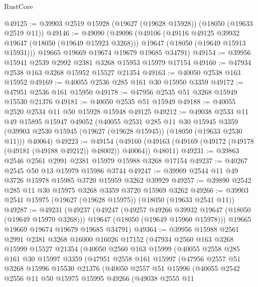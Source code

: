 \begin{lexlean}{RustCore}
\begin{coremodule}
@49125 := @39903 @2519 @15928 (@19627 (@19628 @15928)) (@18050 (@19633 @2519 @11))
@49146 := @49090
    (@49096
      (@49106
        (@49116 @49125 @39932 @19647 (@18050 (@19649 @15923 @3268)))
        @19647
        (@18050 (@19649 @15913 @15931)))
      @19665
      @19669
      @19674
      @19679
      @19685
      @34791)
@49154 := @39956 @15941 @2539 @2992 @2381 @3268 @15953 @15979 @17154
@49160 := @47934 @2538 @163 @3268 @15952 @15527 @21354
@49163 := @40050 @2538 @163 @15952
@49169 := @40055 @2536 @285 @161 @30 @15950 @3359
@49172 := @47951 @2536 @161 @15950
@49178 := @47956 @2535 @51 @3268 @15949 @15530 @21376
@49181 := @40050 @2535 @51 @15949
@49188 := @40055 @2520 @2534 @11 @50 @15928 @15948 @49125
@49212 := @49038
    @2533
    @11
    @49
    @15895
    @15947
    @49052
    (@40055
      @2531
      @285
      @11
      @30
      @15945
      @3359
      (@39903 @2530 @15945 (@19627 (@19628 @15945)) (@18050 (@19633 @2530 @11)))
      @40064)
@49223 := @49154
    (@49160 (@49163 (@49169 (@49172 (@49178 (@49181 (@49188 @49212)) @48002)) @40064)) @48011)
@49231 := @39863 @2546 @2561 @2991 @2381 @15979 @15988 @3268 @17154
@49237 := @40267 @2545 @50 @13 @15979 @15986 @3744
@49247 := @39909 @2544 @11 @49 @3726 @15978 @15985 @3720 @15959 @3262 @39929
@49257 := @39890 @2542 @285 @11 @30 @15975 @3268 @3359 @3720 @15969 @3262
@49266 := @39903 @2541 @15975 (@19627 (@19628 @15975)) (@18050 (@19633 @2541 @11))
@49287 := @49231
    (@49237
      (@49247
        (@49257 @49266 @39932 @19647 (@18050 (@19649 @15970 @3268)))
        @19647
        (@18050 (@19649 @15960 @15978)))
      @19665
      @19669
      @19674
      @19679
      @19685
      @34791)
@49364 := @39956
    @15988
    @2561
    @2991
    @2381
    @3268
    @16000
    @16026
    @17152
    (@47934
      @2560
      @163
      @3268
      @15999
      @15527
      @21354
      (@40050
        @2560
        @163
        @15999
        (@40055
          @2558
          @285
          @161
          @30
          @15997
          @3359
          (@47951
            @2558
            @161
            @15997
            (@47956
              @2557
              @51
              @3268
              @15996
              @15530
              @21376
              (@40050
                @2557
                @51
                @15996
                (@40055
                  @2542
                  @2556
                  @11
                  @50
                  @15975
                  @15995
                  @49266
                  (@49038
                    @2555
                    @11

\end{coremodule}
\end{lexlean}
